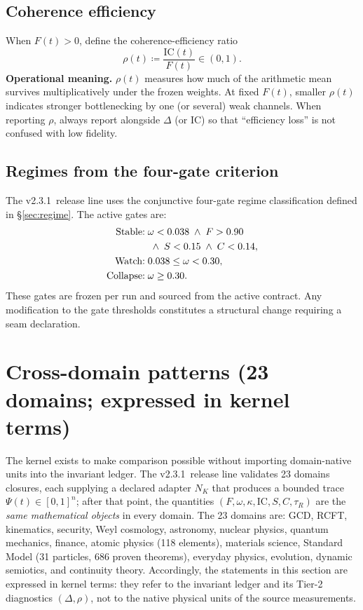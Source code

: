 \documentclass[
  aps,
  prd,
  preprint,
  superscriptaddress,
  nofootinbib,
  floatfix
]{revtex4-2}
\newcommand{\IC}{\mathrm{IC}}
\newcommand{\ValidatorLine}{v2.3.1}
\begin{document}
\subsection{Coherence efficiency}
When $F(t)>0$, define the coherence-efficiency ratio
\begin{equation}
  \rho(t) \coloneqq \frac{\IC(t)}{F(t)} \in (0,1).
\end{equation}
\noindent\textbf{Operational meaning.}
$\rho(t)$ measures how much of the arithmetic mean survives multiplicatively under the frozen weights.
At fixed $F(t)$, smaller $\rho(t)$ indicates stronger bottlenecking by one (or several) weak channels.
When reporting $\rho$, always report alongside $\Delta$ (or $\IC$) so that ``efficiency loss'' is not confused with low fidelity.

\subsection{Regimes from the four-gate criterion}
The \ValidatorLine\ release line uses the conjunctive four-gate regime classification defined in \S\ref{sec:regime}.
The active gates are:
\begin{align}
\text{Stable:}\;& \omega<0.038 \;\wedge\; F>0.90 \notag\\
  &\;\wedge\; S<0.15 \;\wedge\; C<0.14, \notag\\
\text{Watch:}\;& 0.038\le\omega<0.30, \notag\\
\text{Collapse:}\;& \omega\ge0.30.
\end{align}
These gates are frozen per run and sourced from the active contract.
Any modification to the gate thresholds constitutes a structural change requiring a seam declaration.
\section{Cross-domain patterns (23 domains; expressed in kernel terms)}
\label{sec:cross_domain}

The kernel exists to make comparison possible without importing domain-native units into the invariant ledger.
The \ValidatorLine\ release line validates 23 domains closures, each supplying a declared adapter $N_K$ that produces
a bounded trace $\Psi(t)\in[0,1]^n$; after that point, the quantities $(F,\omega,\kappa,\IC,S,C,\tau_R)$ are the
\emph{same mathematical objects} in every domain.
The 23 domains are: GCD, RCFT, kinematics, security, Weyl cosmology, astronomy, nuclear physics, quantum mechanics,
finance, atomic physics (118 elements), materials science, Standard Model (31 particles, 686 proven theorems),
everyday physics, evolution, dynamic semiotics, and continuity theory.
Accordingly, the statements in this section are expressed in kernel terms: they refer to the invariant ledger and its
Tier-2 diagnostics $(\Delta,\rho)$, not to the native physical units of the source measurements.
\end{document}
